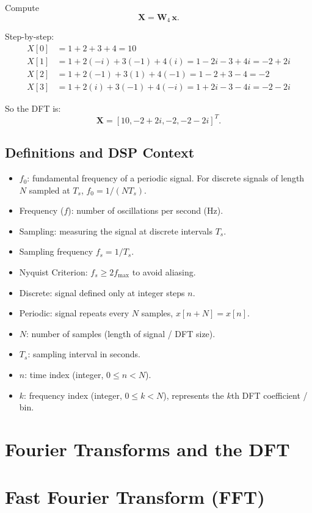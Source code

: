 \documentclass[a4paper,12pt]{article}
\begin{document}
Compute
\[
\mathbf{X} = \mathbf{W}_4 \, \mathbf{x}.
\]

Step-by-step:
\[
\begin{aligned}
X[0] &= 1 + 2 + 3 + 4 = 10 \\
X[1] &= 1 + 2(-i) + 3(-1) + 4(i) = 1 - 2i -3 + 4i = -2 + 2i \\
X[2] &= 1 + 2(-1) + 3(1) + 4(-1) = 1 -2 +3 -4 = -2 \\
X[3] &= 1 + 2(i) + 3(-1) + 4(-i) = 1 +2i -3 -4i = -2 -2i
\end{aligned}
\]

So the DFT is:
\[
\mathbf{X} = [10, -2+2i, -2, -2-2i]^T.
\]

\subsection{Definitions and DSP Context}

\begin{itemize}
    \item $f_0$: fundamental frequency of a periodic signal. For discrete signals of length $N$ sampled at $T_s$, $f_0 = 1/(N T_s)$.
    \item Frequency ($f$): number of oscillations per second (Hz).
    \item Sampling: measuring the signal at discrete intervals $T_s$.
    \item Sampling frequency $f_s = 1/T_s$.
    \item Nyquist Criterion: $f_s \ge 2 f_\text{max}$ to avoid aliasing.
    \item Discrete: signal defined only at integer steps $n$.
    \item Periodic: signal repeats every $N$ samples, $x[n+N] = x[n]$.
    \item $N$: number of samples (length of signal / DFT size).
    \item $T_s$: sampling interval in seconds.
    \item $n$: time index (integer, $0 \le n < N$).
    \item $k$: frequency index (integer, $0 \le k < N$), represents the $k$th DFT coefficient / bin.
\end{itemize}

\section{\Large\textbf{Fourier Transforms and the DFT}}


\section{\Huge\textbf{Fast Fourier Transform (FFT)}}
\end{document}
